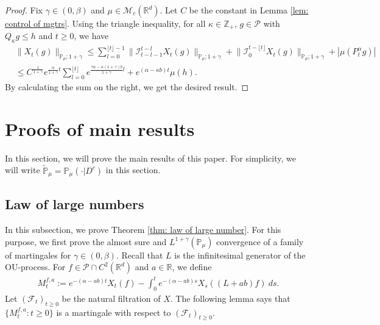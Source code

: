 \documentclass[12pt,a4paper]{amsart}
\theoremstyle{plain}
\theoremstyle{definition}
\numberwithin{equation}{section}
\begin{document}
\begin{proof}
  Fix $\gamma \in (0,\beta)$ and $\mu \in \mathcal M_c(\mathbb R^d)$.
  Let $C$ be the constant in Lemma \ref{lem: control of mgtrs}.
  Using the triangle inequality, for all $\kappa\in \mathbb Z_+$, $g \in \mathcal P$ with $Q_\kappa g \leq h$ and $t\geq 0$, we have
  \begin{align}
    & \|X_t(g)\|_{\mathbb P_\mu;1+\gamma}
      \leq \sum_{l=0}^{\lfloor t\rfloor - 1}\big\| \mathcal{I}_{t-l-1}^{t-l}X_t(g) \big\|_{\mathbb P_\mu;1+\gamma}+\big\| \mathcal{I}_{0}^{t-\lfloor t \rfloor}X_t(g)  \big\|_{\mathbb P_\mu;1+\gamma} + |\mu(P^\alpha_t g)| \\
    & \leq C^{\frac{1}{1+\gamma}} e^{\frac{\alpha}{1+\gamma}t} \sum_{l=0}^{\lfloor t\rfloor} e^{\frac{\gamma\alpha-\kappa (1+\gamma)b}{1+\gamma} l} + e^{(\alpha - \kappa b)t} \mu(h).
  \end{align}
  By calculating the sum on the right, we get the desired result.
\end{proof}

\section{Proofs of main results}
\label{proofs of main results}
In this section, we will prove the main results of this paper.
For simplicity, we will write $\mathbb{\widetilde{P}}_{\mu}=\mathbb{P}_{\mu}(\cdot|D^c)$ in this section.

\subsection{Law of large numbers}
\label{sec: large rate lln}

In this subsection, we prove Theorem \ref{thm: law of large number}.
For this purpose, we first prove the almost sure and $L^{1+\gamma}(\mathbb{P}_{\mu})$ convergence of a family of martingales for $\gamma\in (0, \beta)$. Recall that $L$ is the infinitesimal generator of the OU-process.  For $f\in \mathcal{P}\cap C^2(\mathbb R^d)$ and  $a\in \mathbb R$, we define
\begin{align}
  \label{defmartingale}
  M_t^{f,a}
   :=e^{-(\alpha-ab)t}X_t(f)-\int_0^t e^{-(\alpha-ab)s} X_s((L+ab)f)~ ds.
\end{align}
Let $(\mathscr{F}_t)_{t\geq 0}$ be the natural filtration of $X$.  The following lemma says that $\{M_t^{f,a}: t\geq 0\}$ is a martingale with respect to $(\mathscr{F}_t)_{t\geq 0}$.
\end{document}
